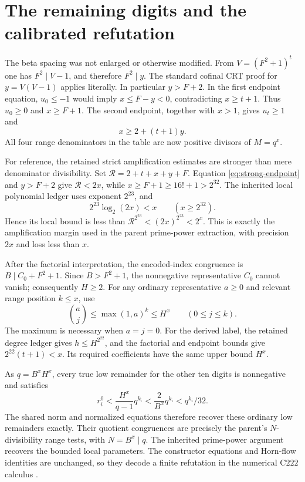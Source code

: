 \section{The remaining digits and the calibrated refutation}

The beta spacing was not enlarged or otherwise modified.
From \(V=(F^2+1)^t\) one has \(F^2\mid V-1\), and therefore
\(F^2\mid y\). The standard cofinal CRT proof for
\(y=V(V-1)\) applies literally. In particular \(y>F+2\).
In the first endpoint equation, \(u_0\le-1\) would imply
\(x\le F-y<0\), contradicting \(x\ge t+1\). Thus
\(u_0\ge0\) and \(x\ge F+1\).
The second endpoint, together with \(x>1\), gives \(u_t\ge1\) and
\begin{equation}\label{eq:strong-endpoint}
 x\ge2+(t+1)y.
\end{equation}
All four range denominators in the table are now positive divisors
of \(M=q^x\).

For reference, the retained strict amplification estimates are stronger
than mere denominator divisibility. Set
\(\mathcal R=2+t+x+y+F\). Equation \eqref{eq:strong-endpoint}
and \(y>F+2\) give \(\mathcal R<2x\), while
\(x\ge F+1\ge16!+1>2^{32}\). The inherited local polynomial
ledger uses exponent \(2^{23}\), and
\[
 2^{23}\log_2(2x)<x\qquad(x\ge2^{32}).
\]
Hence its local bound is less than
\(\mathcal R^{2^{23}}<(2x)^{2^{23}}<2^x\).
This is exactly the amplification margin used in the parent
prime-power extraction, with precision \(2x\) and loss less than \(x\).

After the factorial interpretation, the encoded-index congruence is
\(B\mid C_0+F^2+1\). Since \(B>F^2+1\), the nonnegative
representative \(C_0\) cannot vanish; consequently \(H\ge2\).
For any ordinary representative \(a\ge0\) and relevant range position
\(k\le x\), use
\[
 \binom aj\le\max(1,a)^k\le H^x\qquad(0\le j\le k).
\]
The maximum is necessary when \(a=j=0\).
For the derived label, the retained degree ledger gives
\(h\le H^{2^{22}}\), and the factorial and endpoint bounds give
\(2^{22}(t+1)<x\). Its required coefficients have the same
upper bound \(H^x\).

As \(q=B^xH^x\), every true low remainder for the other ten digits
is nonnegative and satisfies
\[
 r_i^0<\frac{H^x}{q-1}q^{k_i}
       <\frac{2}{B^x}q^{k_i}<q^{k_i}/32.
\]
The shared norm and normalized equations therefore recover these
ordinary low remainders exactly. Their quotient congruences are precisely
the parent's \(N\)-divisibility range tests, with \(N=B^x\mid q\).
The inherited prime-power argument recovers the bounded local
parameters. The constructor equations and Horn-flow identities are
unchanged, so they decode a finite refutation in the numerical
\(\mathrm{C222}\) calculus \cite{common,repo}.

